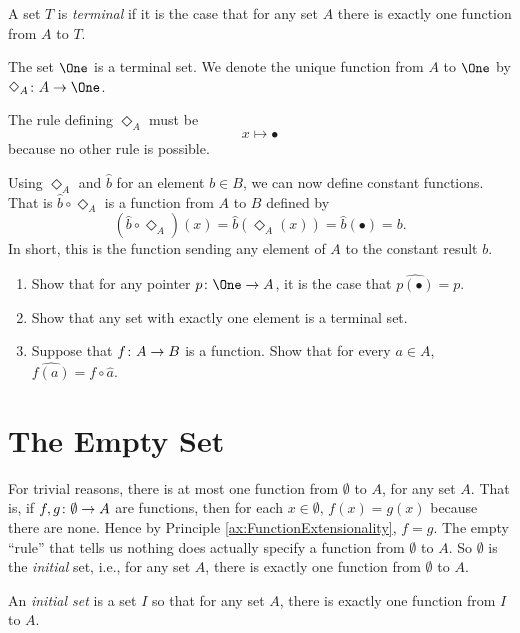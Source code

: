 \begin{defn}\label{def:terminal}
	A set $T$ is \emph{terminal} if it is the case that for any set $A$ there is exactly one function from $A$ to $T$.
\end{defn}

\begin{principle}
	The set $\One$ is a terminal set. 
	We denote the unique function from $A$ to $\One$ by $\fromto {\Diamond_A}{A}\One$.
	
	The rule defining $\Diamond_A$ must be
	\[x\mapsto\bullet\]
	because no other rule is possible. 
\end{principle}

Using $\Diamond_A$ and $\hat{b}$ for an element $b\in B$, we can now define constant functions. 
That is $\hat{b}\circ\Diamond_A$ is a function from $A$ to $B$ defined by 
\[(\hat{b}\circ\Diamond_A)(x) = \hat{b}(\Diamond_A(x))= \hat{b}(\bullet) = b.\] 
In short, this is the function sending any element of $A$ to the constant result $b$. 

\begin{exercises}
	\begin{enumerate}
		\item Show that for any pointer $\fromto p\One A$, it is the case that $\widehat{p(\bullet)}=p$.
		\item Show that any set with exactly one element is a terminal set.
		\item Suppose that ${f}\colon{A}\to{B}$ is a function. Show that for every $a\in A$, $\widehat{f(a)} = f\circ \hat{a}$.
	\end{enumerate}
\end{exercises}

\section{The Empty Set}

For trivial reasons, there is at most one function from $\emptyset$ to $A$,
for any set $A$. That is,  if ${f,g}\colon{\emptyset}\to{A}$ are functions, then
for each $x\in\emptyset$, $f(x)=g(x)$ because there are none. Hence by Principle \ref{ax:FunctionExtensionality}, $f=g$. The empty ``rule'' that tells us nothing does actually specify a function from $\emptyset$ to $A$. So $\emptyset$ 
is the \emph{initial} set, i.e., for any set $A$, there is exactly one function from $\emptyset$ to $A$.

\begin{defn}
	An \emph{initial set} is a set $I$ so that for any set $A$, there is exactly one function from $I$ to $A$.
\end{defn}

